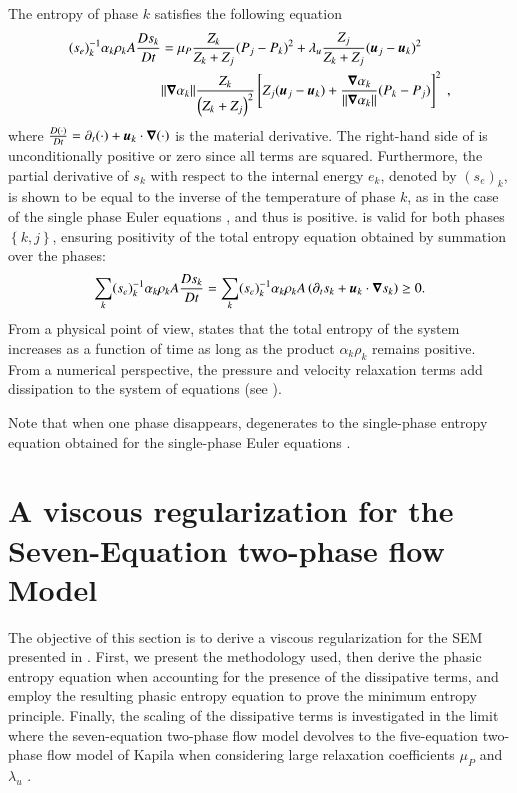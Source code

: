 The entropy of phase $k$ satisfies the following equation
%
\begin{align} \label{eq:ent-eqn-7-eqn-model}
(s_{e})_k^{-1} \alpha_k \rho_k A \frac{Ds_k}{Dt} &= \mu_P \frac{Z_k}{Z_k+Z_j} (P_j - P_k)^2 + \lambda_u \frac{Z_j}{Z_k+Z_j} (\boldsymbol u_j -\boldsymbol u_k)^2 \nonumber
\\
& \| \boldsymbol\nabla \alpha_k \| \frac{Z_k}{\left( Z_k+Z_j \right)^2} \left[ Z_j (\boldsymbol u_j-\boldsymbol u_k)+\frac{\boldsymbol\nabla \alpha_k}{\| \boldsymbol\nabla \alpha_k \|}(P_k-P_j)\right]^2 \ ,
\end{align}
%
where $\frac{D(\cdot) }{Dt} = \partial_t (\cdot) + \boldsymbol u_k \cdot \boldsymbol\nabla (\cdot)$ is the material derivative.
The right-hand side of  is unconditionally positive or zero since all terms are squared. Furthermore, 
the partial derivative of $s_k$ with respect to the internal energy $e_k$, denoted by $(s_e)_k$, is shown to be equal to the inverse of the temperature 
of phase $k$, as in the case of the single phase Euler equations \cite{jlg,Marco_dissertation}, and thus is positive.
 is valid for both phases $\left\{k, j\right\}$, ensuring positivity of the total entropy equation obtained by summation over the phases:
%
\begin{equation}\label{eq:tot-ent-res-sct4}
\sum_k (s_{e})_k^{-1} \alpha_k \rho_k A \frac{Ds_k}{Dt} = \sum_k (s_{e})_k^{-1} \alpha_k \rho_k A \left( \partial_t s_k + \boldsymbol u_k \cdot \boldsymbol\nabla s_k \right) \geq 0  .
\end{equation}
%
From a physical point of view,  states that the total entropy of the system increases as a function of time as long as the product 
$\alpha_k \rho_k$ remains positive. From a numerical perspective, 
the pressure and velocity relaxation terms add dissipation to the system of equations (see ).

Note that when one phase disappears,  degenerates to the single-phase entropy equation obtained for the single-phase Euler equations \cite{SEM,Marco_dissertation}.

\section{A viscous regularization for the Seven-Equation two-phase flow Model}\label{sec:visc-regu}
%
The objective of this section is to derive a viscous regularization for the SEM presented in . First, we present the methodology used, 
then derive the phasic entropy equation when accounting for the presence of the dissipative terms, and employ the resulting phasic entropy equation to prove 
the minimum entropy principle. Finally, the scaling of the dissipative terms is investigated in the limit where the seven-equation two-phase flow model 
devolves to the five-equation two-phase flow model of Kapila \cite{Kapila_2001} when considering large relaxation coefficients $\mu_P$ and $\lambda_u$ \cite{dellacherie}.
%
